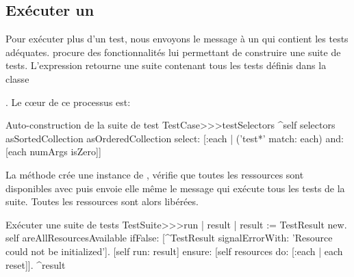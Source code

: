 \documentclass[a4paper,10pt,twoside]{book}
\begin{document}
\subsection{Exécuter un }
Pour exécuter plus d'un test, nous envoyons le message  à un  qui contient les tests adéquates.  procure des fonctionnalités lui permettant de construire  une suite de tests. L'expression  retourne une suite contenant tous les tests définis dans la classe {. Le c\oe ur de ce processus est:
\begin{method}[testcasetestselectors]{Auto-construction de la suite de test}
TestCase>>>testSelectors 
	^self selectors asSortedCollection asOrderedCollection select: [:each | 
		('test*' match: each) and: [each numArgs isZero]]
\end{method}

La méthode  crée une instance de , vérifie que toutes les ressources sont disponibles avec  puis envoie elle même le message  qui exécute tous les tests de la suite. Toutes les ressources sont alors libérées.
\begin{method}[testsuiterun]{Exécuter une suite de tests}
TestSuite>>>run
	| result |
	result := TestResult new.
	self areAllResourcesAvailable
		ifFalse: [^TestResult signalErrorWith:
				   'Resource could not be initialized'].
	[self run: result] ensure: [self resources do:
									 [:each | each reset]].
	^result
\end{method}

}
\end{document}
